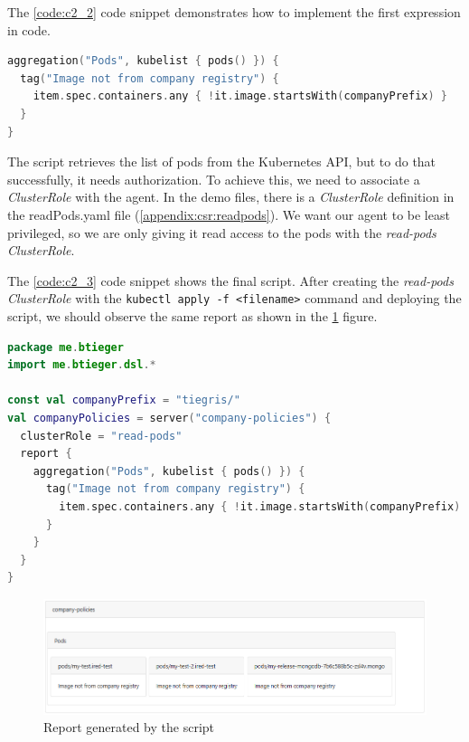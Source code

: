 The \ref{code:c2_2} code snippet demonstrates how to implement the first expression in code.

\begin{minipage}{\linewidth}
\begin{lstlisting}[caption={Tag pods},language=Kotlin,label=code:c2_2]
aggregation("Pods", kubelist { pods() }) {
  tag("Image not from company registry") {
    item.spec.containers.any { !it.image.startsWith(companyPrefix) }
  }
}
\end{lstlisting}
\end{minipage}

The script retrieves the list of pods from the Kubernetes API, but to do that successfully, it needs authorization. To achieve this, we need to associate a \emph{ClusterRole} with the agent. In the demo files, there is a \emph{ClusterRole} definition in the readPods.yaml file (\ref{appendix:csr:readpods}). We want our agent to be least privileged, so we are only giving it read access to the pods with the \emph{read-pods} \emph{ClusterRole}.

The \ref{code:c2_3} code snippet shows the final script. After creating the \emph{read-pods} \emph{ClusterRole} with the \lstinline|kubectl apply -f <filename>| command and deploying the script, we should observe the same report as shown in the \ref{fig:report} figure.

\begin{lstlisting}[caption={Final reporting script},language=Kotlin,label=code:c2_3]
package me.btieger
import me.btieger.dsl.*

const val companyPrefix = "tiegris/"
val companyPolicies = server("company-policies") {
  clusterRole = "read-pods"
  report {
    aggregation("Pods", kubelist { pods() }) {
      tag("Image not from company registry") {
        item.spec.containers.any { !it.image.startsWith(companyPrefix) }
      }
    }
  }
}
\end{lstlisting}

\begin{figure}[h]
  \centering
  \includegraphics[width=150mm, keepaspectratio]{content/60_caseStudy2/company_policies_1.png}
  \caption{Report generated by the script}
  \label{fig:report}
\end{figure}

